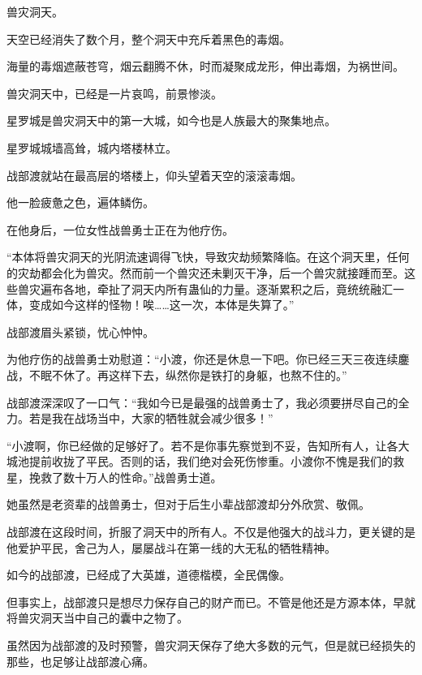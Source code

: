 
\begin{this_body}



兽灾洞天。

天空已经消失了数个月，整个洞天中充斥着黑色的毒烟。

海量的毒烟遮蔽苍穹，烟云翻腾不休，时而凝聚成龙形，伸出毒烟，为祸世间。

兽灾洞天中，已经是一片哀鸣，前景惨淡。

星罗城是兽灾洞天中的第一大城，如今也是人族最大的聚集地点。

星罗城城墙高耸，城内塔楼林立。

战部渡就站在最高层的塔楼上，仰头望着天空的滚滚毒烟。

他一脸疲惫之色，遍体鳞伤。

在他身后，一位女性战兽勇士正在为他疗伤。

“本体将兽灾洞天的光阴流速调得飞快，导致灾劫频繁降临。在这个洞天里，任何的灾劫都会化为兽灾。然而前一个兽灾还未剿灭干净，后一个兽灾就接踵而至。这些兽灾遍布各地，牵扯了洞天内所有蛊仙的力量。逐渐累积之后，竟统统融汇一体，变成如今这样的怪物！唉……这一次，本体是失算了。”

战部渡眉头紧锁，忧心忡忡。

为他疗伤的战兽勇士劝慰道：“小渡，你还是休息一下吧。你已经三天三夜连续鏖战，不眠不休了。再这样下去，纵然你是铁打的身躯，也熬不住的。”

战部渡深深叹了一口气：“我如今已是最强的战兽勇士了，我必须要拼尽自己的全力。若是我在战场当中，大家的牺牲就会减少很多！”

“小渡啊，你已经做的足够好了。若不是你事先察觉到不妥，告知所有人，让各大城池提前收拢了平民。否则的话，我们绝对会死伤惨重。小渡你不愧是我们的救星，挽救了数十万人的性命。”战兽勇士道。

她虽然是老资辈的战兽勇士，但对于后生小辈战部渡却分外欣赏、敬佩。

战部渡在这段时间，折服了洞天中的所有人。不仅是他强大的战斗力，更关键的是他爱护平民，舍己为人，屡屡战斗在第一线的大无私的牺牲精神。

如今的战部渡，已经成了大英雄，道德楷模，全民偶像。

但事实上，战部渡只是想尽力保存自己的财产而已。不管是他还是方源本体，早就将兽灾洞天当中自己的囊中之物了。

虽然因为战部渡的及时预警，兽灾洞天保存了绝大多数的元气，但是就已经损失的那些，也足够让战部渡心痛。


\end{this_body}
